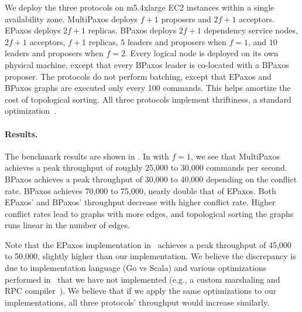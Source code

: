 We deploy the three protocols on m5.4xlarge EC2 instances within a single
availability zone. MultiPaxos deploys $f+1$ proposers and $2f+1$ acceptors.
EPaxos deploys $2f+1$ replicas. BPaxos deploys $2f+1$ dependency service nodes,
$2f+1$ acceptors, $f+1$ replicas, $5$ leaders and proposers when $f=1$, and
$10$ leaders and proposers when $f=2$. Every logical node is deployed on its
own physical machine, except that every BPaxos leader is co-located with a
BPaxos proposer. The protocols do not perform batching, except that EPaxos and
BPaxos graphs are executed only every 100 commands. This helps amortize the
cost of topological sorting. All three protocols implement thriftiness, a
standard optimization~\cite{moraru2013there}.


\paragraph{Results.}
The benchmark results are shown in . In  with
$f=1$, we see that MultiPaxos achieves a peak throughput of roughly 25,000 to
30,000 commands per second. BPaxos achieves a peak throughput of 30,000 to
40,000 depending on the conflict rate. BPaxos achieves 70,000 to 75,000,
nearly double that of EPaxos. Both EPaxos' and BPaxos' throughput decrease with
higher conflict rate. Higher conflict rates lead to graphs with more edges, and
topological sorting the graphs runs linear in the number of edges.

Note that the EPaxos implementation in~\cite{moraru2013there} achieves a peak
throughput of 45,000 to 50,000, slightly higher than our implementation. We
believe the discrepancy is due to implementation language (Go vs Scala) and
various optimizations performed in~\cite{moraru2013there} that we have not
implemented (e.g., a custom marshaling and RPC compiler~\cite{epaxos2019blog}).
We believe that if we apply the same optimizations to our implementations, all
three protocols' throughput would increase similarly.


